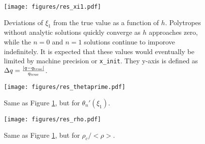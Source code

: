 \documentclass[twocolumn]{aastex631}
\begin{document}
\begin{figure}[h]
    \begin{centering}
        \texttt{[image: figures/res\_xi1.pdf]}
        \caption{Deviations of $\xi_1$ from the true value as a
        function of $h$. Polytropes without analytic solutions
        quickly converge as $h$ approaches zero, while the
        $n=0$ and $n=1$ solutions continue to imporove indefinitely.
        It is expected that these values would eventually
        be limited by machine precision or \texttt{x\_init}.
        They y-axis is defined as
        $\Delta q = \frac{|q-q_{\rm true}|}{q_{\rm true}}$.
        }
        \label{fig:res_xi1}
    \end{centering}
\end{figure}

\begin{figure}[h]
    \begin{centering}
        \texttt{[image: figures/res\_thetaprime.pdf]}
        \caption{Same as Figure \ref{fig:res_xi1}, but for
        $\theta_n'(\xi_1)$.}
        \label{fig:res_thetaprime}
    \end{centering}
\end{figure}

\begin{figure}[h]
    \begin{centering}
        \texttt{[image: figures/res\_rho.pdf]}
        \caption{Same as Figure \ref{fig:res_xi1}, but for
        $\rho_c/<\rho>$.}
        \label{fig:res_rho}
    \end{centering}
\end{figure}







\end{document}
